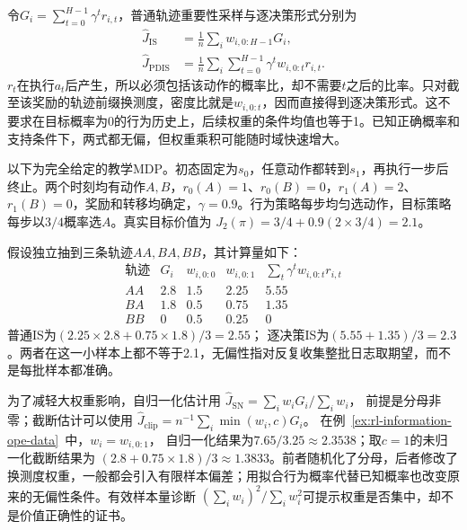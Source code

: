 令$G_i=\sum_{t=0}^{H-1}\gamma^t r_{i,t}$，普通轨迹重要性采样与逐决策形式分别为
\begin{align}
  \label{eq:rl-information-is}
  \widehat J_{\mathrm{IS}}
    &=\frac1n\sum_iw_{i,0:H-1}G_i,\nonumber\\
  \widehat J_{\mathrm{PDIS}}
    &=\frac1n\sum_i\sum_{t=0}^{H-1}
                      \gamma^t w_{i,0:t}r_{i,t}.
\end{align}
$r_t$在执行$a_t$后产生，所以必须包括该动作的概率比，却不需要$t$之后的比率。只对截至该奖励的轨迹前缀换测度，密度比就是$w_{i,0:t}$，因而直接得到逐决策形式。这不要求在目标概率为0的行为历史上，后续权重的条件均值也等于1。已知正确概率和支持条件下，两式都无偏，但权重乘积可能随时域快速增大。

\begin{example}[三条两步轨迹的概率校正]
  \label{ex:rl-information-ope-data}
  以下为完全给定的教学MDP。初态固定为$s_0$，任意动作都转到$s_1$，再执行一步后终止。两个时刻均有动作$A,B$，$r_0(A)=1$、$r_0(B)=0$，$r_1(A)=2$、$r_1(B)=0$，奖励和转移均确定，$\gamma=0.9$。行为策略每步均匀选动作，目标策略每步以$3/4$概率选$A$。真实目标价值为
  $J_2(\pi)=3/4+0.9(2\times3/4)=2.1$。

  假设独立抽到三条轨迹$AA,BA,BB$，其计算量如下：
  \[
  \begin{array}{c|rrrr}
    \text{轨迹}&G_i&w_{i,0:0}&w_{i,0:1}
                    &\sum_t\gamma^t w_{i,0:t}r_{i,t}\\
    \hline
    AA&2.8&1.5&2.25&5.55\\
    BA&1.8&0.5&0.75&1.35\\
    BB&0&0.5&0.25&0
  \end{array}
  \]
  普通IS为$(2.25\times2.8+0.75\times1.8)/3=2.55$；
  逐决策IS为$(5.55+1.35)/3=2.3$。两者在这一小样本上都不等于2.1，无偏性指对反复收集整批日志取期望，而不是每批样本都准确。
\end{example}

为了减轻大权重影响，自归一化估计用
$\widehat J_{\mathrm{SN}}=\sum_iw_iG_i/\sum_iw_i$，
前提是分母非零；截断估计可以使用
$\widehat J_{\mathrm{clip}}=n^{-1}\sum_i\min(w_i,c)G_i$。
在例~\ref{ex:rl-information-ope-data}~中，$w_i=w_{i,0:1}$，
自归一化结果为$7.65/3.25\approx2.3538$；取$c=1$的未归一化截断结果为
$(2.8+0.75\times1.8)/3\approx1.3833$。前者随机化了分母，后者修改了换测度权重，一般都会引入有限样本偏差；用拟合行为概率代替已知概率也改变原来的无偏性条件。有效样本量诊断
$(\sum_iw_i)^2/\sum_iw_i^2$可提示权重是否集中，却不是价值正确性的证书。

